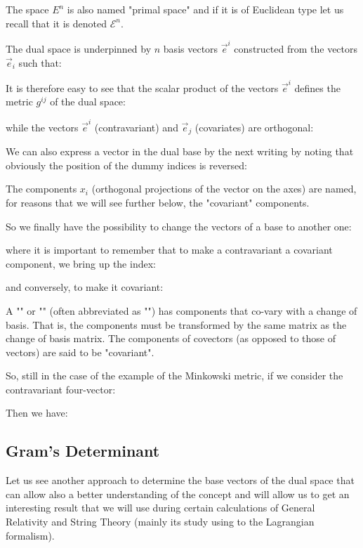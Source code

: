 	\begin{tcolorbox}[title=Remark,colframe=black,arc=10pt]
	The space $E^n$ is also named "primal space" and if it is of Euclidean type let us recall that it is denoted $\mathcal{E}^n$.
	\end{tcolorbox}
	The dual space is underpinned by $n$ basis vectors $\vec{e}^i$ constructed from the vectors $\vec{e}_i$ such that:
	
	It is therefore easy to see that the scalar product of the vectors $\vec{e}^i$ defines the metric $g^{ij}$ of the dual space:
	
	while the vectors $\vec{e}^i$ (contravariant) and $\vec{e}_j$ (covariates) are orthogonal:
	
	We can also express a vector in the dual base by the next writing by noting that obviously the position of the dummy indices is reversed:
	
	\begin{tcolorbox}[title=Remark,colframe=black,arc=10pt]
	The components $x_i$ (orthogonal projections of the vector on the axes) are named, for reasons that we will see further below, the "covariant" components.
	\end{tcolorbox}
	So we finally have the possibility to change the vectors of a base to another one:
	
	where it is important to remember that to make a contravariant a covariant  component, we bring up the index:
	
	and conversely, to make it covariant:
	
	A "" or "" (often abbreviated as "") has components that co-vary with a change of basis. That is, the components must be transformed by the same matrix as the change of basis matrix. The components of covectors (as opposed to those of vectors) are said to be "covariant".
	
	So, still in the case of the example of the Minkowski metric, if we consider the contravariant four-vector:
	
	Then we have:
	
	
	\subsection{Gram's Determinant}
	Let us see another approach to determine the base vectors of the dual space that can allow also a better understanding of the concept and will allow us to get an interesting result that we will use during certain calculations of General Relativity and String Theory (mainly its study using to the Lagrangian formalism).
	
